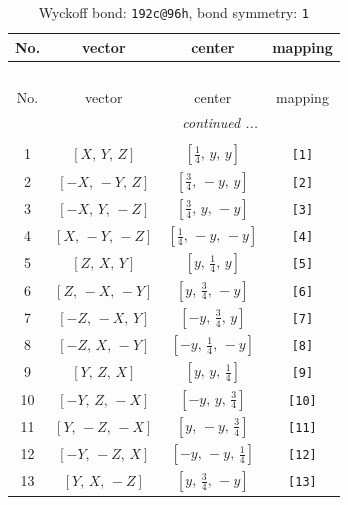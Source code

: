 \documentclass[fleqn,8pt]{jsarticle}
\begin{document}
\begin{longtable}{cccc}
\caption{Wyckoff bond: {\tt 192c@96h}, bond symmetry: {\tt 1}}
 \\
 \hline \hline
No. & vector & center & mapping \\ \hline \endfirsthead

\multicolumn{3}{l}{\tablename\ \thetable{}} \\
 \hline \hline
No. & vector & center & mapping \\ \hline \endhead

 \hline \hline
\multicolumn{3}{r}{\footnotesize\it continued ...} \\ \endfoot

 \hline \hline
\multicolumn{3}{r}{} \\ \endlastfoot

1 & $\left[ X,\, Y,\, Z \right]$ & $\left[ \frac{1}{4},\, y,\, y \right]$ & {\tt [1]} \\ \hline
2 & $\left[ - X,\, - Y,\, Z \right]$ & $\left[ \frac{3}{4},\, - y,\, y \right]$ & {\tt [2]} \\ \hline
3 & $\left[ - X,\, Y,\, - Z \right]$ & $\left[ \frac{3}{4},\, y,\, - y \right]$ & {\tt [3]} \\ \hline
4 & $\left[ X,\, - Y,\, - Z \right]$ & $\left[ \frac{1}{4},\, - y,\, - y \right]$ & {\tt [4]} \\ \hline
5 & $\left[ Z,\, X,\, Y \right]$ & $\left[ y,\, \frac{1}{4},\, y \right]$ & {\tt [5]} \\ \hline
6 & $\left[ Z,\, - X,\, - Y \right]$ & $\left[ y,\, \frac{3}{4},\, - y \right]$ & {\tt [6]} \\ \hline
7 & $\left[ - Z,\, - X,\, Y \right]$ & $\left[ - y,\, \frac{3}{4},\, y \right]$ & {\tt [7]} \\ \hline
8 & $\left[ - Z,\, X,\, - Y \right]$ & $\left[ - y,\, \frac{1}{4},\, - y \right]$ & {\tt [8]} \\ \hline
9 & $\left[ Y,\, Z,\, X \right]$ & $\left[ y,\, y,\, \frac{1}{4} \right]$ & {\tt [9]} \\ \hline
10 & $\left[ - Y,\, Z,\, - X \right]$ & $\left[ - y,\, y,\, \frac{3}{4} \right]$ & {\tt [10]} \\ \hline
11 & $\left[ Y,\, - Z,\, - X \right]$ & $\left[ y,\, - y,\, \frac{3}{4} \right]$ & {\tt [11]} \\ \hline
12 & $\left[ - Y,\, - Z,\, X \right]$ & $\left[ - y,\, - y,\, \frac{1}{4} \right]$ & {\tt [12]} \\ \hline
13 & $\left[ Y,\, X,\, - Z \right]$ & $\left[ y,\, \frac{3}{4},\, - y \right]$ & {\tt [13]} \\ \hline

\end{longtable}
\end{document}
